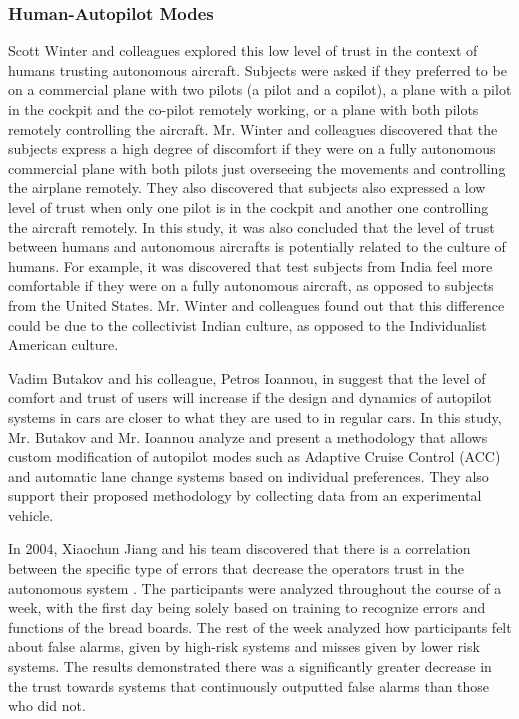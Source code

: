 \documentclass[runningheads,a4paper]{llncs}
\begin{document}
\subsubsection{Human-Autopilot Modes}
Scott Winter and colleagues \cite{winter2015indian} explored this low level of trust in the context of humans trusting autonomous aircraft. Subjects were asked if they preferred to be on a commercial plane with two pilots (a pilot and a copilot), a plane with a pilot in the cockpit and the co-pilot remotely working, or a plane with both pilots remotely controlling the aircraft. Mr. Winter and colleagues discovered that the subjects express a high degree of discomfort if they were on a fully autonomous commercial plane with both pilots just overseeing the movements and controlling the airplane remotely. They also discovered that subjects also expressed a low level of trust when only one pilot is in the cockpit and another one controlling the aircraft remotely. In this study, it was also concluded that the level of trust between humans and autonomous aircrafts is potentially related to the culture of humans. For example, it was discovered that test subjects from India feel more comfortable if they were on a fully autonomous aircraft, as opposed to subjects from the United States. Mr. Winter and colleagues found out that this difference could be due to the collectivist Indian culture, as opposed to the Individualist American culture.

Vadim Butakov and his colleague, Petros Ioannou, in \cite{butakov2015driving} suggest that the level of comfort and trust of users will increase if the design and dynamics of autopilot systems in cars are closer to what they are used to in regular cars. In this study, Mr. Butakov and Mr. Ioannou analyze and present a methodology that allows custom modification of autopilot modes such as  Adaptive Cruise Control (ACC) and automatic lane change systems based on individual preferences. They also support their proposed methodology by collecting data from an experimental vehicle.

In 2004, Xiaochun Jiang and his team discovered that there is a correlation between the specific type of errors that decrease the operators trust in the autonomous system \cite{jiang2004measurement}. The participants were analyzed throughout the course of a week, with the first day being solely based on training to recognize errors and functions of the bread boards. The rest of the week analyzed how participants felt about false alarms, given by high-risk systems and misses given by lower risk systems. The results demonstrated there was a significantly greater decrease in the trust towards systems that continuously outputted false alarms than those who did not.
\end{document}

